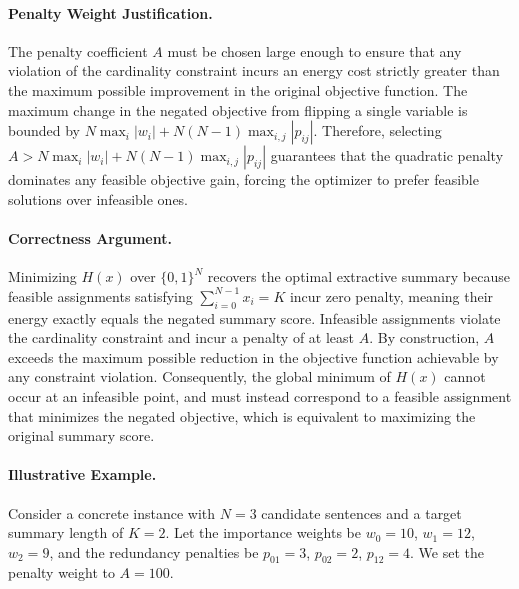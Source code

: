 \documentclass[12pt]{article}
\begin{document}
\paragraph{Penalty Weight Justification.}
The penalty coefficient $A$ must be chosen large enough to ensure that any violation of the cardinality constraint incurs an energy cost strictly greater than the maximum possible improvement in the original objective function. The maximum change in the negated objective from flipping a single variable is bounded by $N \max_{i} |w_i| + N(N-1) \max_{i,j} |p_{ij}|$. Therefore, selecting $A > N \max_{i} |w_i| + N(N-1) \max_{i,j} |p_{ij}|$ guarantees that the quadratic penalty dominates any feasible objective gain, forcing the optimizer to prefer feasible solutions over infeasible ones.

\paragraph{Correctness Argument.}
Minimizing $H(x)$ over $\{0,1\}^N$ recovers the optimal extractive summary because feasible assignments satisfying $\sum_{i=0}^{N-1} x_i = K$ incur zero penalty, meaning their energy exactly equals the negated summary score. Infeasible assignments violate the cardinality constraint and incur a penalty of at least $A$. By construction, $A$ exceeds the maximum possible reduction in the objective function achievable by any constraint violation. Consequently, the global minimum of $H(x)$ cannot occur at an infeasible point, and must instead correspond to a feasible assignment that minimizes the negated objective, which is equivalent to maximizing the original summary score.

\paragraph{Illustrative Example.}
Consider a concrete instance with $N=3$ candidate sentences and a target summary length of $K=2$. Let the importance weights be $w_0=10$, $w_1=12$, $w_2=9$, and the redundancy penalties be $p_{01}=3$, $p_{02}=2$, $p_{12}=4$. We set the penalty weight to $A=100$.
\end{document}
